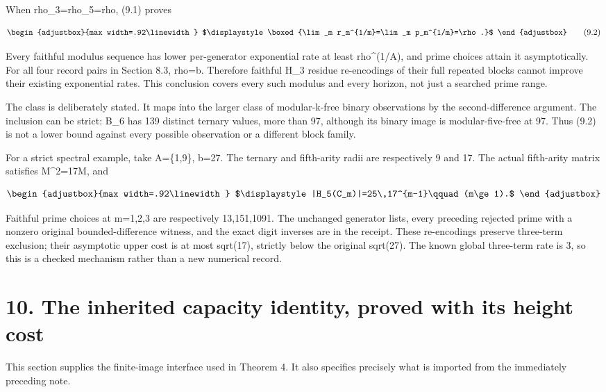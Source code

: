 When rho\_3=rho\_5=rho, (9.1) proves

\[
\begin{adjustbox}{max width=.92\linewidth}
$\displaystyle \boxed{\lim_m r_m^{1/m}=\lim_m p_m^{1/m}=\rho.}$
\end{adjustbox}
\tag{9.2}
\]

Every faithful modulus sequence has lower per-generator exponential rate at least rho\^{}(1/\textbar A\textbar), and prime choices attain it asymptotically. For all four record pairs in Section 8.3, rho=b. Therefore faithful H\_3 residue re-encodings of their full repeated blocks cannot improve their existing exponential rates. This conclusion covers every such modulus and every horizon, not just a searched prime range.

The class is deliberately stated. It maps into the larger class of modular-k-free binary observations by the second-difference argument. The inclusion can be strict: B\_6 has 139 distinct ternary values, more than 97, although its binary image is modular-five-free at 97. Thus (9.2) is not a lower bound against every possible observation or a different block family.

For a strict spectral example, take A=\{1,9\}, b=27. The ternary and fifth-arity radii are respectively 9 and 17. The actual fifth-arity matrix satisfies M\^{}2=17M, and

\[
\begin{adjustbox}{max width=.92\linewidth}
$\displaystyle |H_5(C_m)|=25\,17^{m-1}\qquad(m\ge1).$
\end{adjustbox}
\]

Faithful prime choices at m=1,2,3 are respectively 13,151,1091. The unchanged generator lists, every preceding rejected prime with a nonzero original bounded-difference witness, and the exact digit inverses are in the receipt. These re-encodings preserve three-term exclusion; their asymptotic upper cost is at most sqrt(17), strictly below the original sqrt(27). The known global three-term rate is 3, so this is a checked mechanism rather than a new numerical record.

\section{10. The inherited capacity identity, proved with its height cost}\label{n24-the-inherited-capacity-identity-proved-with-its-height-cost}

This section supplies the finite-image interface used in Theorem 4. It also specifies precisely what is imported from the immediately preceding note.

